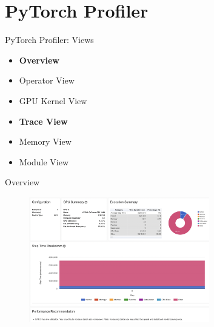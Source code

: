 \documentclass[compress,aspectratio=169]{beamer}
\begin{document}
\section{PyTorch Profiler}
\sectionIntro %

\begin{frame}{PyTorch Profiler: Views}
\begin{itemize}
    \item \textbf{Overview}
    \item Operator View
    \item GPU Kernel View
    \item \textbf{Trace View}
    \item Memory View
    \item Module View
\end{itemize}
\end{frame}

\begin{frame}{Overview}
	\vspace{-1em}
\begin{center}
    \begin{figure}
        \includegraphics[width=0.7\textwidth]{../../data/scap_gtx1080_profiler-torch_14650076}
    \end{figure}
\end{center}

\end{frame}
\end{document}
